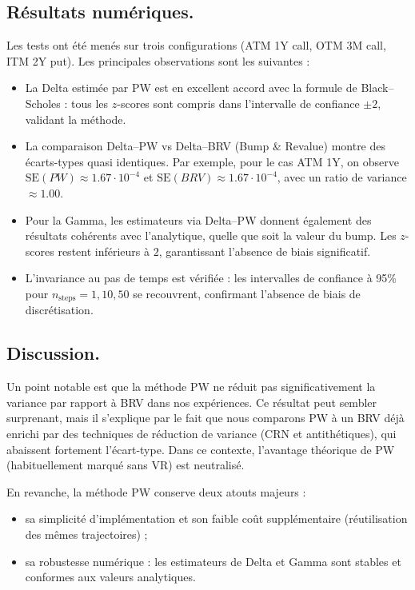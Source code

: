 \documentclass[a4paper,11pt]{article}
\begin{document}
\subsection*{Résultats numériques.}  
Les tests ont été menés sur trois configurations (ATM 1Y call, OTM 3M call, ITM 2Y put).  
Les principales observations sont les suivantes :
\begin{itemize}
  \item La Delta estimée par PW est en excellent accord avec la formule de Black--Scholes : tous les $z$-scores sont compris dans l’intervalle de confiance $\pm 2$, validant la méthode.
  \item La comparaison Delta--PW vs Delta--BRV (Bump \& Revalue) montre des écarts-types quasi identiques. Par exemple, pour le cas ATM 1Y, on observe $\mathrm{SE}(PW)\approx 1.67\cdot 10^{-4}$ et $\mathrm{SE}(BRV)\approx 1.67\cdot 10^{-4}$, avec un ratio de variance $\approx 1.00$.
  \item Pour la Gamma, les estimateurs via Delta--PW donnent également des résultats cohérents avec l’analytique, quelle que soit la valeur du bump. Les $z$-scores restent inférieurs à $2$, garantissant l’absence de biais significatif.
  \item L’invariance au pas de temps est vérifiée : les intervalles de confiance à 95\% pour $n_{\text{steps}}=1,10,50$ se recouvrent, confirmant l’absence de biais de discrétisation.
\end{itemize}

\subsection*{Discussion.}  
Un point notable est que la méthode PW ne réduit pas significativement la variance par rapport à BRV dans nos expériences. Ce résultat peut sembler surprenant, mais il s’explique par le fait que nous comparons PW à un BRV déjà enrichi par des techniques de réduction de variance (CRN et antithétiques), qui abaissent fortement l’écart-type. Dans ce contexte, l’avantage théorique de PW (habituellement marqué sans VR) est neutralisé.  

En revanche, la méthode PW conserve deux atouts majeurs :
\begin{itemize}
  \item sa simplicité d’implémentation et son faible coût supplémentaire (réutilisation des mêmes trajectoires) ;
  \item sa robustesse numérique : les estimateurs de Delta et Gamma sont stables et conformes aux valeurs analytiques.
\end{itemize}
\end{document}
